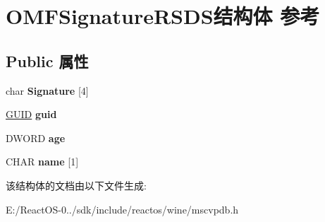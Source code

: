 \hypertarget{struct_o_m_f_signature_r_s_d_s}{}\section{O\+M\+F\+Signature\+R\+S\+D\+S结构体 参考}
\label{struct_o_m_f_signature_r_s_d_s}
\subsection*{Public 属性}
\begin{DoxyCompactItemize}
\item 
\mbox{\label{struct_o_m_f_signature_r_s_d_s_aeb96283fa2520c3e8f8c1a1119b17ba8}} 
char {\bfseries Signature} \mbox{[}4\mbox{]}
\item 
\mbox{\label{struct_o_m_f_signature_r_s_d_s_a9a612458e124dd3df7f7b7c9972bc640}} 
\hyperlink{interface_g_u_i_d}{G\+U\+ID} {\bfseries guid}
\item 
\mbox{\label{struct_o_m_f_signature_r_s_d_s_a26cd829e94724161009a7f519bb16799}} 
D\+W\+O\+RD {\bfseries age}
\item 
\mbox{\label{struct_o_m_f_signature_r_s_d_s_a890091f20803e7e1a7da8d2918867d0f}} 
C\+H\+AR {\bfseries name} \mbox{[}1\mbox{]}
\end{DoxyCompactItemize}


该结构体的文档由以下文件生成\+:\begin{DoxyCompactItemize}
\item 
E\+:/\+React\+O\+S-\/0../sdk/include/reactos/wine/mscvpdb.\+h\end{DoxyCompactItemize}
